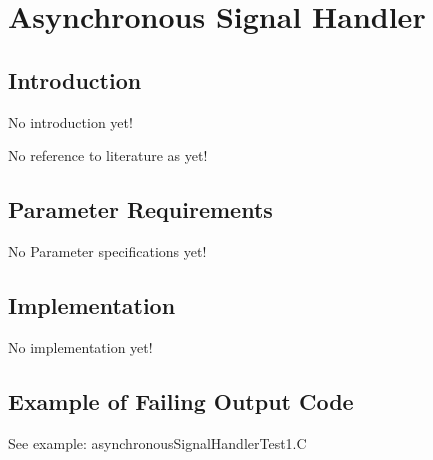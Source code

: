 \section{Asynchronous Signal Handler}

\label{AsynchronousSignalHandler::overview}


\subsection{Introduction}

   No introduction yet!


No reference to literature as yet!

\subsection{Parameter Requirements}

   No Parameter specifications yet!

\subsection{Implementation}

   No implementation yet!

\subsection{Example of Failing Output Code}

     See example: asynchronousSignalHandlerTest1.C

\begin{latexonly}
{\codeFontSize

}
\end{latexonly}



